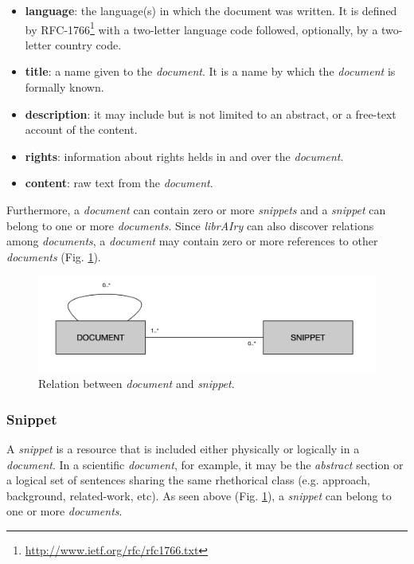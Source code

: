 \begin{itemize}
\item \textbf{language}: the language(s) in which the document was written. It is defined by RFC-1766\footnote{\url{http://www.ietf.org/rfc/rfc1766.txt}} with a two-letter language code followed, optionally, by a two-letter country code.
\item \textbf{title}: a name given to the \textit{document}. It is a name by which the \textit{document} is formally known.
\item \textbf{description}: it may include but is not limited to an abstract, or a free-text account of the content.
\item \textbf{rights}: information about rights helds in and over the \textit{document}.
\item \textbf{content}: raw text from the \textit{document}.
\end{itemize}

Furthermore, a \textit{document} can contain zero or more \textit{snippets} and a \textit{snippet} can belong to one or more \textit{documents}. Since \textit{librAIry} can also discover relations among \textit{documents}, a \textit{document} may contain zero or more references to other \textit{documents} (Fig. \ref{fig:librairy-model-document}).

\begin{figure}
  \center
  \includegraphics[scale=0.45]{model-document.png}
  \caption{Relation between \textit{document} and \textit{snippet}.}
  \label{fig:librairy-model-document}
\end{figure}

\subsubsection{Snippet}

A \textit{snippet} is a resource that is included either physically or logically in a \textit{document}. In a scientific \textit{document}, for example, it may be the \textit{abstract} section or a logical set of sentences sharing the same rhethorical class (e.g. approach, background, related-work, etc). As seen above (Fig. \ref{fig:librairy-model-document}), a \textit{snippet} can belong to one or more \textit{documents}.

